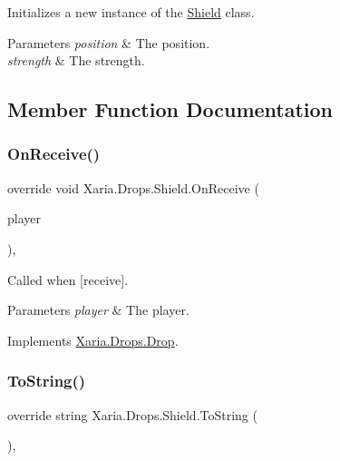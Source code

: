 Initializes a new instance of the \hyperlink{classXaria_1_1Drops_1_1Shield}{Shield} class. 


\begin{DoxyParams}{Parameters}
{\em position} & The position.\\
\hline
{\em strength} & The strength.\\
\hline
\end{DoxyParams}


\subsection{Member Function Documentation}
\mbox{\label{classXaria_1_1Drops_1_1Shield_a8c222c24381f32eab822d004c734aafd}} 
\subsubsection{\texorpdfstring{On\+Receive()}{OnReceive()}}
{\footnotesize\ttfamily override void Xaria.\+Drops.\+Shield.\+On\+Receive (\begin{DoxyParamCaption}\item[{ref \hyperlink{classXaria_1_1Player}{Player}}]{player }\end{DoxyParamCaption})\hspace{0.3cm}{\ttfamily [inline]}, {\ttfamily [virtual]}}



Called when \mbox{[}receive\mbox{]}. 


\begin{DoxyParams}{Parameters}
{\em player} & The player.\\
\hline
\end{DoxyParams}


Implements \hyperlink{classXaria_1_1Drops_1_1Drop_abb5544bb56ff889f557888bd9e86f7cb}{Xaria.\+Drops.\+Drop}.

\mbox{\label{classXaria_1_1Drops_1_1Shield_ae6a57bede76de2462ce37a7de4bac987}} 
\subsubsection{\texorpdfstring{To\+String()}{ToString()}}
{\footnotesize\ttfamily override string Xaria.\+Drops.\+Shield.\+To\+String (\begin{DoxyParamCaption}{ }\end{DoxyParamCaption})\hspace{0.3cm}{\ttfamily [inline]}, {\ttfamily [virtual]}}



